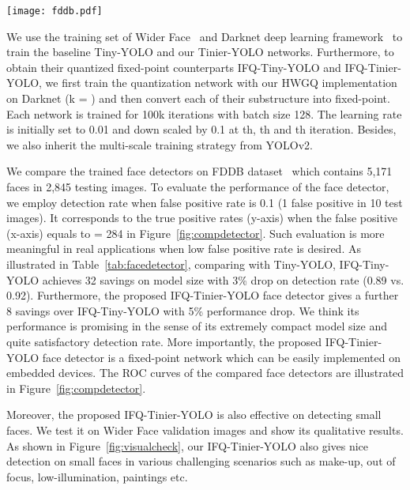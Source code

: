 \documentclass[10pt,twocolumn,letterpaper]{article}
\begin{document}
\begin{figure*}[!htb]
	\begin{center}
		\texttt{[image: fddb.pdf]}
	\end{center}
	\caption{Qualitative performance of the proposed IFQ-Tiner-YOLO () face detector on Wider Face dataset~\cite{widerface}.}
	\label{fig:visualcheck}
\end{figure*}

We use the training set of Wider Face~\cite{widerface} and Darknet deep learning framework~\cite{darknet} to train the baseline Tiny-YOLO and our Tinier-YOLO networks. Furthermore, to obtain their quantized fixed-point counterparts IFQ-Tiny-YOLO and IFQ-Tinier-YOLO, we first train the quantization network with our HWGQ implementation on Darknet (k = ) and then convert each of their substructure into fixed-point. Each network is trained for 100k iterations with batch size 128. The learning rate is initially set to 0.01 and down scaled by 0.1 at th, th and th iteration. Besides, we also inherit the multi-scale training strategy from YOLOv2.



We compare the trained face detectors on FDDB dataset~\cite{FDDB} which contains 5,171 faces in 2,845 testing images. To evaluate the performance of the face detector, we employ detection rate when false positive rate is 0.1 (1 false positive in 10 test images). It corresponds to the true positive rates (y-axis) when the false positive (x-axis) equals to  = 284 in Figure~\ref{fig:compdetector}. Such evaluation is more meaningful in real applications when low false positive rate is desired. As illustrated in Table~\ref{tab:facedetector}, comparing with Tiny-YOLO, IFQ-Tiny-YOLO achieves 32 savings on model size with 3\% drop on detection rate (0.89 vs. 0.92). Furthermore, the proposed IFQ-Tinier-YOLO face detector gives a further 8 savings over IFQ-Tiny-YOLO with 5\% performance drop. We think its performance is promising in the sense of its extremely compact model size and quite satisfactory detection rate. More importantly, the proposed IFQ-Tinier-YOLO face detector is a fixed-point network which can be easily implemented on embedded devices. The ROC curves of the compared face detectors are illustrated in Figure~\ref{fig:compdetector}. 

Moreover, the proposed IFQ-Tinier-YOLO is also effective on detecting small faces. We test it on Wider Face validation images and show its qualitative results. As shown in Figure~\ref{fig:visualcheck}, our IFQ-Tinier-YOLO also gives nice detection on small faces in various challenging scenarios such as make-up, out of focus, low-illumination, paintings etc.
\end{document}
